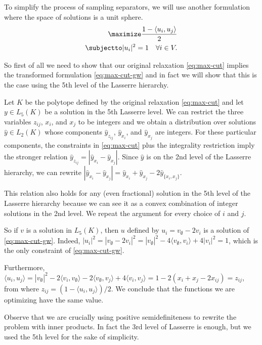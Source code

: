 \documentclass[a4paper,twoside,justified]{tufte-handout}
\begin{document}
To simplify the process of sampling separators, we will use another formulation where the space of solutions is a unit sphere.
\begin{alignat}{2}
\label{eq:max-cut-gw}
  \maximize \frac{1- \langle u_i,u_j \rangle}{2}\notag \\
  \subjectto |u_i|^2 = 1 \quad \forall i\in V.
\end{alignat}

So first of all we need to show that our original relaxation \eqref{eq:max-cut} implies the transformed formulation \eqref{eq:max-cut-gw} and in fact we will show that this is the case using the 5th level of the Lasserre hierarchy.

Let $K$ be the polytope defined by the original relaxation \eqref{eq:max-cut} and let $y \in L_5(K)$ be a solution in the 5th Lasserre level. We can restrict the three variables $z_{ij}$, $x_i$, and $x_j$ to be integers and we obtain a distribution over solutions $\hat y \in L_2(K)$ whose components $\hat y_{z_{ij}}$, $\hat y_{x_i}$, and $\hat y_{x_j}$ are integers. For these particular components, the constraints in \eqref{eq:max-cut} plus the integrality restriction imply the stronger relation $\hat y_{z_{ij}}=|\hat y_{x_i}-\hat y_{x_j}|$. Since $\hat y$ is on the 2nd level of the Lasserre hierarchy, we can rewrite $|\hat y_{x_i}-\hat y_{x_j}|=\hat y_{x_i} + \hat y_{x_j} - 2\hat y_{\{x_i,x_j\}}$.

This relation also holds for any (even fractional) solution in the 5th level of the Lasserre hierarchy because we can see it as a convex combination of integer solutions in the 2nd level. We repeat the argument for every choice of $i$ and $j$.

So if $v$ is a solution in $L_5(K)$, then $u$ defined by $u_i = v_\emptyset - 2v_i$ is a solution of  \eqref{eq:max-cut-gw}. Indeed, $|u_i|^2 = |v_\emptyset - 2v_i|^2 = |v_\emptyset|^2 -4\langle v_\emptyset,v_i\rangle + 4|v_i|^2 =1$, which is the only constraint of \eqref{eq:max-cut-gw}.

Furthermore, $\langle u_i,u_j\rangle = |v_\emptyset|^2 -2 \langle v_i,v_\emptyset\rangle -2\langle v_\emptyset,v_j\rangle +4\langle v_i,v_j\rangle = 1 - 2(x_i+x_j-2x_{ij}) = z_{ij}$, from where $z_{ij} = (1-\langle u_i,u_j \rangle)/2$. We conclude that the functions we are optimizing have the same value.

Observe that we are crucially using positive semidefiniteness to rewrite the problem with inner products. In fact the 3rd level of Lasserre is enough\cite{lasserresurvey2013}, but we used the 5th level for the sake of simplicity.
\end{document}
